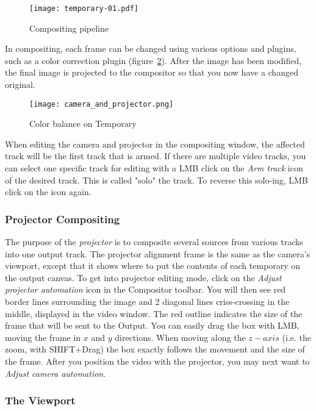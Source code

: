 \begin{figure}[htpb]
    \centering
    \texttt{[image: temporary-01.pdf]}
    \caption{Compositing pipeline}
    \label{fig:temporary-01}
\end{figure}

In compositing, each frame can be changed using various options and plugins, such as
a color correction plugin (figure~\ref{fig:camera_and_projector}).  After the image has been
modified, the final image is projected to the compositor so that you now have a changed original.

\begin{figure}[htpb]
    \centering
    \texttt{[image: camera\_and\_projector.png]}
    \caption{Color balance on Temporary}
    \label{fig:camera_and_projector}
\end{figure}

When editing the camera and projector in the compositing window, the affected track will be the
first track that is armed.  If there are multiple video tracks, you can select one specific track
for editing with a LMB click on the \textit{Arm track} icon of the desired track. This is called
"solo" the track. To reverse this solo-ing, LMB click on the icon again. 

\subsubsection*{Projector Compositing}%
\label{ssub:projector_compositing}

The purpose of the \textit{projector} is to composite several sources from various tracks into one
output track.  The projector alignment frame is the same as the camera's viewport, except that it
shows where to put the contents of each temporary on the output canvas.  To get into projector
editing mode, click on the \textit{Adjust projector automation} icon in the Compositor toolbar. You
will then see red border lines surrounding the image and 2 diagonal lines criss-crossing in the 
middle, displayed in the video window.  The red outline indicates the size of the frame that will be
sent to the Output. You can easily drag the box with LMB, moving the frame in $x$ and $y$ directions.
When moving along the $z-axis$ (i.e. the zoom, with SHIFT+Drag) the box exactly follows the movement
and the size of the frame. After you position the video with the projector, you may next want to
\textit{Adjust camera automation}.

\subsubsection*{The Viewport}%
\label{ssub:viewport}

